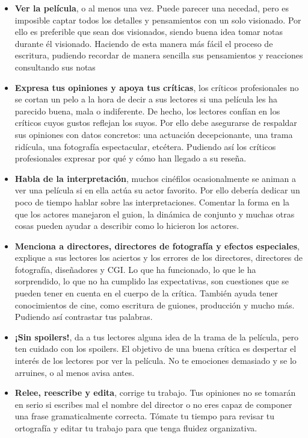 \begin{itemize}
\item \textbf{Ver la película}, o al menos una vez. Puede parecer una necedad, pero es imposible captar todos los detalles y pensamientos con un solo visionado. Por ello es preferible que sean dos visionados, siendo buena idea tomar notas durante él visionado. Haciendo de esta manera más fácil el proceso de escritura, pudiendo recordar de manera sencilla sus pensamientos y reacciones consultando sus notas 
\item \textbf{Expresa tus opiniones y apoya tus críticas}, los críticos profesionales no se cortan un pelo a la hora de decir a sus lectores si una película les ha parecido buena, mala o indiferente. De hecho, los lectores confían en los críticos cuyos gustos reflejan los suyos. Por ello debe asegurarse de respaldar sus opiniones con datos concretos: una actuación decepcionante, una trama ridícula, una fotografía espectacular, etcétera. Pudiendo así los críticos profesionales expresar por qué y cómo han llegado a su reseña.
\item \textbf{Habla de la interpretación}, muchos cinéfilos ocasionalmente se animan a ver una película si en ella actúa su actor favorito. Por ello debería dedicar un poco de tiempo hablar sobre las interpretaciones. Comentar la forma en la que los actores manejaron el guion, la dinámica de conjunto y muchas otras cosas pueden ayudar a describir como lo hicieron los actores.
\item \textbf{Menciona a directores, directores de fotografía y efectos especiales}, explique a sus lectores los aciertos y los errores de los directores, directores de fotografía, diseñadores y CGI. Lo que ha funcionado, lo que le ha sorprendido, lo que no ha cumplido las expectativas, son cuestiones que se pueden tener en cuenta en el cuerpo de la crítica. También ayuda tener conocimientos de cine, como escritura de guiones, producción y mucho más. Pudiendo así contrastar tus palabras.
\item \textbf{¡Sin spoilers!}, da a tus lectores alguna idea de la trama de la película, pero ten cuidado con los spoilers. El objetivo de una buena crítica es despertar el interés de los lectores por ver la película. No te emociones demasiado y se lo arruines, o al menos avisa antes.
\item \textbf{Relee, reescribe y edita}, corrige tu trabajo. Tus opiniones no se tomarán en serio si escribes mal el nombre del director o no eres capaz de componer una frase gramaticalmente correcta. Tómate tu tiempo para revisar tu ortografía y editar tu trabajo para que tenga fluidez organizativa.
\end{itemize}

